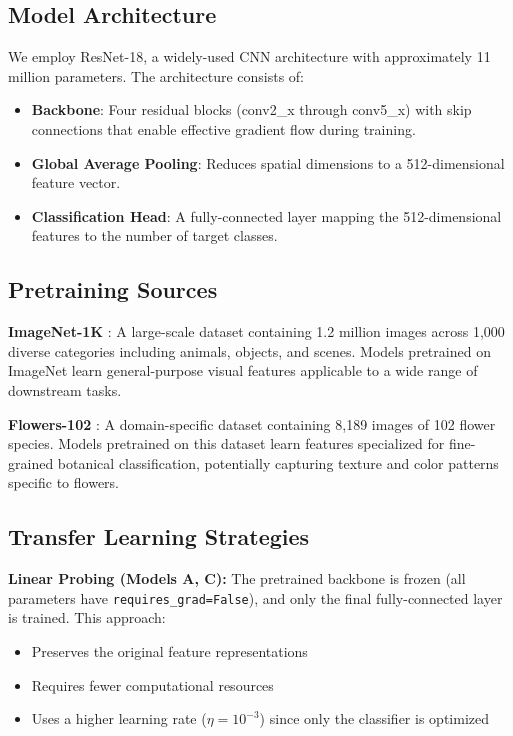 \documentclass[11pt,a4paper]{article}
\begin{document}
\subsection{Model Architecture}

We employ ResNet-18, a widely-used CNN architecture with approximately 11 million parameters. The architecture consists of:

\begin{itemize}
    \item \textbf{Backbone}: Four residual blocks (conv2\_x through conv5\_x) with skip connections that enable effective gradient flow during training.
    \item \textbf{Global Average Pooling}: Reduces spatial dimensions to a 512-dimensional feature vector.
    \item \textbf{Classification Head}: A fully-connected layer mapping the 512-dimensional features to the number of target classes.
\end{itemize}

\subsection{Pretraining Sources}

\textbf{ImageNet-1K} \citep{deng2009imagenet}: A large-scale dataset containing 1.2 million images across 1,000 diverse categories including animals, objects, and scenes. Models pretrained on ImageNet learn general-purpose visual features applicable to a wide range of downstream tasks.

\textbf{Flowers-102} \citep{nilsback2008automated}: A domain-specific dataset containing 8,189 images of 102 flower species. Models pretrained on this dataset learn features specialized for fine-grained botanical classification, potentially capturing texture and color patterns specific to flowers.

\subsection{Transfer Learning Strategies}

\textbf{Linear Probing (Models A, C):} The pretrained backbone is frozen (all parameters have \texttt{requires\_grad=False}), and only the final fully-connected layer is trained. This approach:
\begin{itemize}
    \item Preserves the original feature representations
    \item Requires fewer computational resources
    \item Uses a higher learning rate ($\eta = 10^{-3}$) since only the classifier is optimized
\end{itemize}
\end{document}
